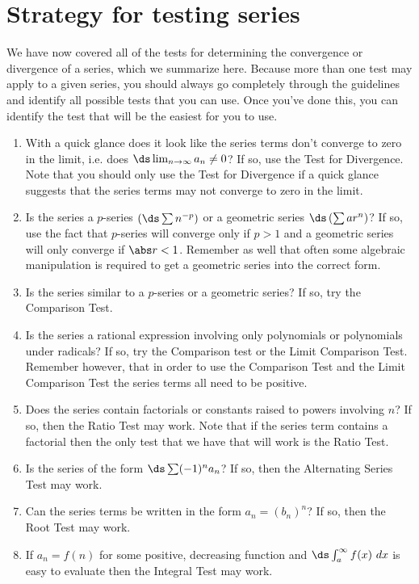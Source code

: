 \section{Strategy for testing series}\label{sec:series_techniques}

We have now covered all of the tests for determining the convergence or divergence of a series, which we summarize here. Because more than one test may apply to a given series, you should always go completely through the guidelines and identify all possible tests that you can use. Once you've done this, you can identify the test that will be the easiest for you to use.

\begin{enumerate}
\item With a quick glance does it look like the series terms don't converge to zero in the limit, i.e. does $\ds \lim_{n\to \infty}a_n \neq 0$? If so, use the Test for Divergence. Note that you should only use the Test for Divergence if a quick glance suggests that the series terms may not converge to zero in the limit.

\item Is the series a $p$-series $\left(\ds\sum n^{-p}\right)$ or a geometric series $\ds \left( \sum ar^n\right)$? If so, use the fact that $p$-series will converge only  if $p>1$ and a geometric series will only converge if $\abs r<1$. Remember as well that often some algebraic manipulation is required to get a geometric series into the correct form.

\item Is the series similar to a $p$-series or a geometric series? If so, try the Comparison Test.

\item Is the series a rational expression involving only polynomials or polynomials under radicals? If so, try the Comparison test or the Limit Comparison Test. Remember however, that in order to use the Comparison Test and the Limit Comparison Test the series terms all need to be positive.

\item Does the series contain factorials or constants raised to powers involving $n$? If so, then the Ratio Test may work. Note that if the series term contains a factorial then the only test that we have that will work is the Ratio Test.

\item Is the series of the form $\ds \sum (-1)^n a_n$? If so, then the Alternating Series Test may work.

\item Can the series terms be written in the form $a_n=(b_n)^n$? If so, then the Root Test may work.

\item If $a_n=f(n)$ for some positive, decreasing function and $\ds \int_a^\infty f(x)\ dx$ is easy to evaluate then the Integral Test may work.
\end{enumerate}

